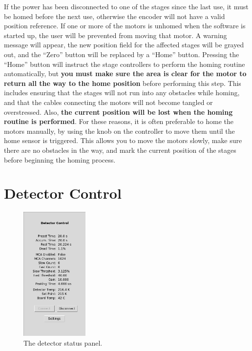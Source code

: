 If the power has been disconnected to one of the stages since the last use, it
must be homed before the next use, otherwise the encoder will not have a valid
position reference. If one or more of the motors is unhomed when the software is
started up, the user will be prevented from moving that motor. A warning message
will appear, the new position field for the affected stages will be grayed out,
and the ``Zero'' button will be replaced by a ``Home'' button. Pressing the
``Home'' button will instruct the stage controllers to perform the homing
routine automatically, but \textbf{you must make sure the area is clear for the
  motor to return all the way to the home position} before performing this
step. This includes ensuring that the stages will not run into any obstacles
while homing, and that the cables connecting the motors will not become tangled
or overstressed. Also, \textbf{the current position will be lost when the homing
  routine is performed}. For these reasons, it is often preferable to home the
motors manually, by using the knob on the controller to move them until the home
sensor is triggered. This allows you to move the motors slowly, make sure there
are no obstacles in the way, and mark the current position of the stages before
beginning the homing process.


\section{Detector Control}

\begin{figure}
\centering \includegraphics[width=0.3\textwidth]{detctl.png}
\caption{\label{fig:detctl} The detector status panel.}
\end{figure}

